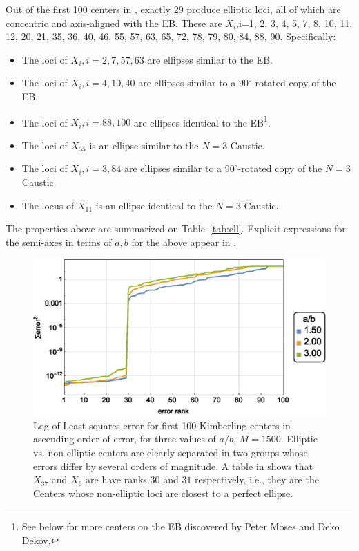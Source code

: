 \begin{theorem} \label{main}
Out of the first 100 centers in \cite{etc}, exactly 29 produce elliptic loci, all of which are concentric and axis-aligned with the EB. These are $X_i$,i=1, 2, 3, 4, 5, 7, 8, 10, 11, 12, 20, 21, 35, 36, 40, 46, 55, 57, 63, 65, 72, 78, 79, 80, 84, 88, 90. Specifically:
\begin{itemize}
\item The loci of $X_i,i=2,7,57,63$ are ellipses similar to the EB.
\item The loci of $X_i,i=4,10,40$ are ellipses similar to a $90^\circ$-rotated copy of the EB.
\item The loci of $X_i,i=88,100$ are ellipses identical to the EB\footnote{See below for more centers on the EB discovered by Peter Moses and Deko Dekov.}.
\item The loci of $X_{55}$ is an ellipse similar to the $N=3$ Caustic.
\item The loci of $X_i,i=3,84$ are ellipses similar to a $90^\circ$-rotated copy of the $N=3$ Caustic.
\item The locus of $X_{11}$ is an ellipse identical to the $N=3$ Caustic.
\end{itemize}
\label{thm:loci29}
\end{theorem}

The properties above are summarized on Table~\ref{tab:ell}. Explicit expressions for the semi-axes in terms of $a,b$ for the above appear in \cite[Part I]{garcia2021-ellipses-web}. 

\begin{figure}
    \centering
    \includegraphics[width=.7\textwidth]{pics_1100_least_squares_error.eps}
    \caption{Log of Least-squares error for first 100 Kimberling centers in ascending order of error, for three values of $a/b$, $M=1500$. Elliptic vs. non-elliptic centers are clearly separated in two groups whose errors differ by several orders of magnitude. A table in \cite[Part II]{garcia2021-ellipses-web} shows that $X_{37}$ and $X_6$ are have ranks $30$ and $31$ respectively, i.e., they are the Centers whose non-elliptic loci are closest to a perfect ellipse.}
    \label{fig:least-squares-error-graph}
\end{figure}

